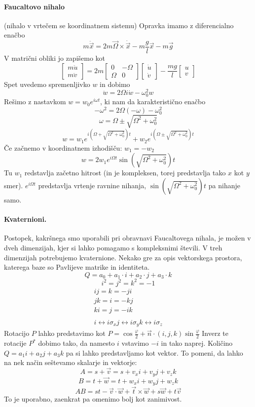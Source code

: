 \documentclass[a4paper]{article}
\newcommand{\vct}[1]{\overrightarrow{#1}}
\begin{document}
\paragraph{Faucaltovo nihalo} (nihalo v vrtečem se koordinatnem sistemu)
Opravka imamo z diferencialno enačbo $$m\ddot{\vct{x}} = 2m\vct{\Omega}\times\dot{\vct{x}} - m\frac{g}{l}\vct{x} - m\vct{g}$$
V matrični obliki jo zapišemo kot
$$\begin{bmatrix}
    m\ddot{u} \\ m\ddot{v}
\end{bmatrix} = 2m\begin{bmatrix}
    0 & -\Omega \\
    \Omega & 0
\end{bmatrix}\begin{bmatrix}
    \dot u \\ \dot v
\end{bmatrix} - \frac{mg}{l}\begin{bmatrix}
    u \\ v
\end{bmatrix}$$
Spet uvedemo spremenljivko $w$ in dobimo $$\ddot{w} = 2\Omega i \dot w - \omega_0^2 w$$
Rešimo z nastavkom $w = w_0e^{i\omega t}$, ki nam da karakteristično enačbo
$$-\omega^2 = 2\Omega (-\omega) - \omega_0^2$$
$$\omega = \Omega \pm \sqrt{\Omega^2 + \omega_0^2}$$
$$w = w_1 e^{i(\Omega + \sqrt{\Omega^2 + \omega_0^2})t} + w_2 e^{i(\Omega \pm \sqrt{\Omega^2 + \omega_0^2})t}$$
Če začnemo v koordinatnem izhodišču: $w_1 = -w_2$
$$w = 2w_1e^{i\Omega t}\sin\left(\sqrt{\Omega^2 + \omega_0^2}\right)t$$
Tu $w_1$ redstavlja začetno hitrost (in je kompleksen, torej predstavlja tako $x$ kot $y$ smer). $e^{i \Omega t}$ predstavlja vrtenje ravnine nihanja, $\sin\left(\sqrt{\Omega^2 + \omega_0^2}\right)t$
pa nihanje samo.
\paragraph{Kvaternioni.} Postopek, kakršnega smo uporabili pri obravnavi Faucaltovega nihala, je možen v dveh dimenzijah, kjer si lahko pomagamo s kompleksnimi števili.
V treh dimenzijah potrebujemo kvaternione. Nekako gre za opis vektorskega prostora, katerega baze so Pavlijeve matrike in identiteta.
$$Q = a_0 + a_1 \cdot i + a_2 \cdot j + a_3 \cdot k$$
$$i^2 = j^2 = k^2 = -1$$
\begin{eqnarray*}
    ij = k = -ji \\
    jk = i = -kj \\
    ki = j = -ik \\
    \\
    i \leftrightarrow i\sigma_x
    j \leftrightarrow i\sigma_y
    k \leftrightarrow i\sigma_z
\end{eqnarray*}
Rotacijo $P$ lahko predstavimo kot $\displaystyle{P = \cos\frac{\varphi}{2} + \vct{n}\cdot(i, j, k) \sin\frac{\varphi}{2}}$
Inverz te rotacije $P^*$ dobimo tako, da namesto $i$ vstavimo $-i$ in tako naprej.
Količino $Q = a_1 i + a_2 j + a_3 k$ pa si lahko predstavljamo kot vektor. To pomeni, da lahko na nek način seštevamo skalarje in vektorje:
$$A = s + \vct{v} = s + v_x i + v_y j + v_z k$$
$$B = t + \vct{w} = t + w_x i + w_y j + w_z k$$
$$AB = st - \vct{v}\cdot\vct{w} + \vct{t}\times\vct{w} + s\vct{w} + t\vct{v}$$
To je uporabno, zaenkrat pa omenimo bolj kot zanimivost.
\end{document}

